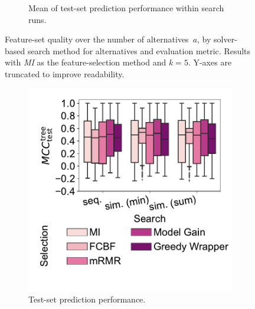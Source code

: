 \documentclass{article}
\theoremstyle{definition}
\begin{document}
\begin{figure}[p]
\begin{subfigure}[t]{0.48\textwidth}
		\caption{Mean of test-set prediction performance within search runs.}
		\label{fig:afs:impact-search-mean-decision-tree-test-mcc}
	\end{subfigure}
	\caption{
		Feature-set quality over the number of alternatives~$a$, by solver-based search method for alternatives and evaluation metric.
		Results with \emph{MI} as the feature-selection method and $k=5$.
		Y-axes are truncated to improve readability.
	}
	\label{fig:afs:impact-search-quality}
\end{figure}

\begin{figure}[t]
	\centering
	\begin{subfigure}[t]{0.48\textwidth}
		\centering
		\includegraphics[width=\textwidth, trim=15 35 5 10, clip]{plots/afs-impact-search-fs-method-decision-tree-test-mcc.pdf}
		\caption{Test-set prediction performance.}
		\label{fig:afs:impact-search-fs-method-decision-tree-test-mcc}
	\end{subfigure}
	\hfill
	\begin{subfigure}[t]{0.48\textwidth}
		\centering

\end{subfigure}
\end{figure}
\end{document}
